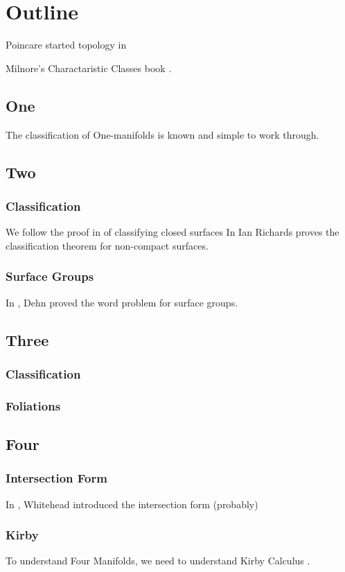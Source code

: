 \chapter{Outline}

Poincare started topology in \cite{poincare_1895}


Milnore's Charactaristic Classes book \cite{milnor_stasheff_2009}.


\section{One}
The classification of One-manifolds is known and simple to work through.
\section{Two}
\subsection{Classification}
We follow the proof in \cite{munkres_2018} of classifying closed surfaces
In \cite{richards_1963} Ian Richards proves the classification theorem for non-compact surfaces.
\subsection{Surface Groups}
In \cite{dehn_1987}, Dehn proved the word problem for surface groups.

\section{Three}
\subsection{Classification}
\subsection{Foliations}

\section{Four}
\subsection{Intersection Form}
In \cite{whitehead_1949}, Whitehead introduced the intersection form (probably)

\subsection{Kirby}
To understand Four Manifolds, we need to understand Kirby Calculus \cite{gompf_stipsicz_1999}.

